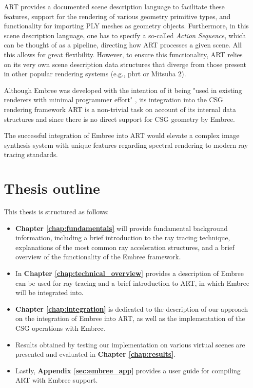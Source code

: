 ART provides a documented scene description language to facilitate these features, support for the rendering of various geometry primitive types, and functionality for importing PLY meshes as geometry objects. Furthermore, in this scene description language, one has to specify a so-called \emph{Action Sequence}, which can be thought of as a pipeline, directing how ART processes a given scene.
All this allows for great flexibility. However, to ensure this functionality, ART relies on its very own scene description data structures that diverge from those present in other popular rendering systems (e.g., pbrt \cite{pharr2016physically} or Mitsuba 2).


Although Embree was developed with the intention of it being "used in existing renderers with minimal programmer effort" \cite[1]{wald2014embree}, its integration into the CSG rendering framework ART is a non-trivial task on account of its internal data structures and since there is no direct support for CSG geometry by Embree.

The successful integration of Embree into ART would elevate a complex image synthesis system with unique features regarding spectral rendering to modern ray tracing standards. 

\section*{Thesis outline}

This thesis is structured as follows:

\begin{itemize}
	\setlength\itemsep{0.05em}
	
	\item \textbf{Chapter \ref{chap:fundamentals}} will provide fundamental background information, including a brief introduction to the ray tracing technique, explanations of the most common ray acceleration structures, and a brief overview of the functionality of the Embree framework.
	
	\item In \textbf{Chapter \ref{chap:technical_overview}} provides a description of Embree can be used for ray tracing and a brief introduction to ART, in which Embree will be integrated into.
	
	\item \textbf{Chapter \ref{chap:integration}} is dedicated to the description of our approach on the integration of Embree into ART, as well as the implementation of the CSG operations with Embree.
	
	\item Results obtained by testing our implementation on various virtual scenes are presented and evaluated in \textbf{Chapter \ref{chap:results}}.
	
	\item Lastly, \textbf{Appendix \ref{sec:embree_app}} provides a user guide for compiling ART with Embree support.
	
\end{itemize}
